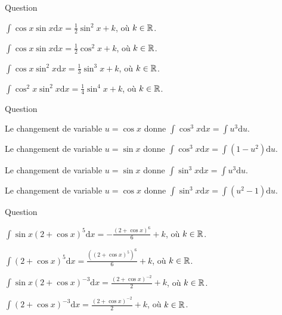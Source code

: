 \begin{multi}[multiple,feedback=
{Avec \(u=\sin x\), on a : \(\mathrm{d}u=\cos x\mathrm{d}x\),
\[\int \cos x\sin x\mathrm{d}x=\int u\mathrm{d}u=\frac{1}{2}u^2+k=\frac{1}{2}\sin ^2x+k,\; k\in \Rr,\]
et
\[\int \cos x\sin ^2x\mathrm{d}x=\int u^2\mathrm{d}u=\frac{1}{3}u^3+k=\frac{1}{3}\sin ^3x+k,\; k\in \Rr.\]
}]{Question}
    \item* \(\displaystyle \int \cos x\sin x\mathrm{d}x=\frac{1}{2}\sin ^2x+k\), où \(k\in \mathbb{R}\).
    \item \(\displaystyle \int \cos x\sin x\mathrm{d}x=\frac{1}{2}\cos ^2x+k\), où \(k\in \mathbb{R}\).
    \item* \(\displaystyle \int \cos x\sin ^2x\mathrm{d}x=\frac{1}{3}\sin ^3x+k\), où \(k\in \mathbb{R}\).
    \item \(\displaystyle \int \cos ^2x\sin ^2x\mathrm{d}x=\frac{1}{4}\sin ^4x+k\), où \(k\in \mathbb{R}\).
\end{multi}


\begin{multi}[multiple,feedback=
{On a : \(\cos ^3x=(1-\sin ^2x)\cos x\). Donc, avec \(u=\sin x\), on a : \(\mathrm{d}u=\cos x\, \mathrm{d}x\) et
\[\int \cos ^3x\mathrm{d}x=\int (1-\sin ^2x)\cos x\mathrm{d}x=\int (1-u^2)\mathrm{d}u.\]
De m\^eme, on a : \(\sin ^3x=(1-\cos ^2x)\sin x\). Donc, avec \(u=\cos x\), on a : \(\mathrm{d}u=-\sin x\mathrm{d}x\) et
\[\int \cos ^3x\mathrm{d}x=\int (1-\cos ^2x)\sin x\mathrm{d}x=-\int (1-u^2)\mathrm{d}u.\]
}]{Question}
    \item Le changement de variable \(u=\cos x\) donne \(\displaystyle \int \cos ^3x\mathrm{d}x=\int u^3\mathrm{d}u\).
    \item* Le changement de variable \(u=\sin x\) donne \(\displaystyle \int \cos ^3x\mathrm{d}x=\int (1-u^2)\mathrm{d}u\).
    \item Le changement de variable \(u=\sin x\) donne \(\displaystyle \int \sin ^3x\mathrm{d}x=\int u^3\mathrm{d}u\).
    \item* Le changement de variable \(u=\cos x\) donne \(\displaystyle \int \sin ^3x\mathrm{d}x=\int (u^2-1)\mathrm{d}u\).
\end{multi}


\begin{multi}[multiple,feedback=
{Avec \(u=2+\cos x\), on a : \(\mathrm{d}u=-\sin x\, \mathrm{d}x\). D'où
\[\int \sin x(2+\cos x)^5\mathrm{d}x=-\int u^5\mathrm{d}u=-\frac{u^6}{6}+k,\; k\in \Rr,\]
et
\[\int \sin x(2+\cos x)^{-3}\mathrm{d}x=-\int u^{-3}\mathrm{d}u=\frac{u^{-2}}{2}+k,\; k\in \Rr.\]
}]{Question}
    \item* \(\displaystyle \int \sin x(2+\cos x)^5\mathrm{d}x=-\frac{(2+\cos x)^6}{6}+k\), où \(k\in \mathbb{R}\).
    \item \(\displaystyle \int (2+\cos x)^5\mathrm{d}x=\frac{((2+\cos x)^5)^6}{6}+k\), où \(k\in \mathbb{R}\).
    \item* \(\displaystyle \int \sin x\left(2+\cos x\right)^{-3}\mathrm{d}x=\frac{\left(2+\cos x\right)^{-2}}{2}+k\), où \(k\in \mathbb{R}\).
    \item \(\displaystyle \int \left(2+\cos x\right)^{-3}\mathrm{d}x=\frac{\left(2+\cos x\right)^{-2}}{2}+k\), où \(k\in \mathbb{R}\).
\end{multi}


